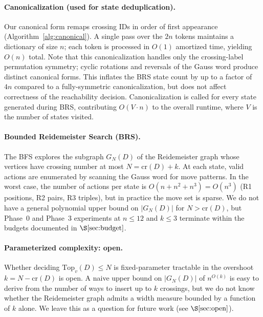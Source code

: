 \paragraph{Canonicalization (used for state deduplication).}
Our canonical form remaps crossing IDs in order of first appearance
(Algorithm~\ref{alg:canonical}).  A single pass over the $2n$ tokens
maintains a dictionary of size $n$; each token is processed in $O(1)$
amortized time, yielding $O(n)$ total.  Note that this canonicalization
handles only the crossing-label permutation symmetry; cyclic rotations
and reversals of the Gauss word produce distinct canonical forms.  This
inflates the BRS state count by up to a factor of $4n$ compared to a
fully-symmetric canonicalization, but does not affect correctness of
the reachability decision.  Canonicalization is called for every state
generated during BRS, contributing $O(V \cdot n)$ to the overall
runtime, where $V$ is the number of states visited.

\paragraph{Bounded Reidemeister Search (BRS).}
The BFS explores the subgraph $G_N(D)$ of the Reidemeister graph whose
vertices have crossing number at most $N = \mathrm{cr}(D) + k$.  At each
state, valid actions are enumerated by scanning the Gauss word for move
patterns.  In the worst case, the number of actions per state is
$O(n + n^2 + n^3) = O(n^3)$ (R1 positions, R2 pairs, R3 triples), but
in practice the move set is sparse.  We do not have a general polynomial
upper bound on $|G_N(D)|$ for $N > \mathrm{cr}(D)$, but Phase~0 and
Phase~3 experiments at $n \leq 12$ and $k \leq 3$ terminate within
the budgets documented in $\S\ref{sec:budget}$.

\paragraph{Parameterized complexity: open.}
Whether deciding $\mathrm{Top}_v(D) \leq N$ is fixed-parameter tractable
in the overshoot $k = N - \mathrm{cr}(D)$ is open.  A naive upper bound
on $|G_N(D)|$ of $n^{O(k)}$ is easy to derive from the number of ways
to insert up to $k$ crossings, but we do not know whether the
Reidemeister graph admits a width measure bounded by a function of $k$
alone.  We leave this as a question for future work (see
$\S\ref{sec:open}$).

